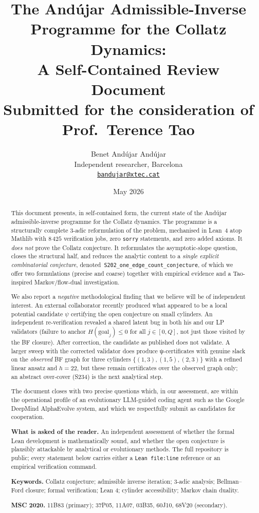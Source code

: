 \documentclass[11pt,a4paper]{article}
\title{The Andújar Admissible-Inverse Programme for the Collatz Dynamics:\\
       A Self-Contained Review Document\\
       \large{Submitted for the consideration of Prof.~Terence Tao}}
\author{Benet Andújar Andújar\\
\small Independent researcher, Barcelona\\
\small \href{mailto:bandujar@xtec.cat}{\texttt{bandujar@xtec.cat}}}
\date{May 2026}
\theoremstyle{plain}
\theoremstyle{definition}
\begin{document}
\maketitle

\begin{abstract}
This document presents, in self-contained form, the current state of
the Andújar admissible-inverse programme for the Collatz dynamics. The
programme is a structurally complete 3-adic reformulation of the
problem, mechanised in Lean~4 atop Mathlib with $8\,425$ verification
jobs, zero \texttt{sorry} statements, and zero added axioms. It
\emph{does not} prove the Collatz conjecture. It reformulates the
asymptotic-slope question, closes the structural half, and reduces the
analytic content to a \emph{single explicit combinatorial conjecture},
denoted~\texttt{S202\_one\_edge\_count\_conjecture}, of which we offer
two formulations (precise and coarse) together with empirical evidence
and a Tao-inspired Markov/flow-dual investigation.

We also report a \emph{negative} methodological finding that we
believe will be of independent interest. An external collaborator
recently produced what appeared to be a local potential candidate
$\psi$ certifying the open conjecture on small cylinders. An
independent re-verification revealed a shared latent bug in both his
and our LP validators (failure to anchor $H(\text{goal}_j) \le 0$ for
all $j \in [0,Q]$, not just those visited by the BF closure). After
correction, the candidate as published does not validate. A larger
sweep with the corrected validator does produce ψ-certificates with
genuine slack on the \emph{observed} BF graph for three cylinders
\(\{(1,3), (1,5), (2,3)\}\) with a refined linear ansatz and
$h = 22$, but these remain certificates over the observed graph
only; an abstract over-cover (S234) is the next analytical step.

The document closes with two precise questions which, in our
assessment, are within the operational profile of an evolutionary
LLM-guided coding agent such as the Google DeepMind AlphaEvolve
system, and which we respectfully submit as candidates for
cooperation.

\bigskip\noindent
\textbf{What is asked of the reader.} An independent assessment of
whether the formal Lean development is mathematically sound, and
whether the open conjecture is plausibly attackable by analytical or
evolutionary methods. The full repository is public; every statement
below carries either a \texttt{Lean file:line} reference or an
empirical verification command.

\medskip\noindent\textbf{Keywords.} Collatz conjecture; admissible
inverse iteration; 3-adic analysis; Bellman--Ford closure; formal
verification; Lean 4; cylinder accessibility; Markov chain duality.

\medskip\noindent\textbf{MSC 2020.}
11B83 (primary); 37P05, 11A07, 03B35, 60J10, 68V20 (secondary).
\end{abstract}
\end{document}
